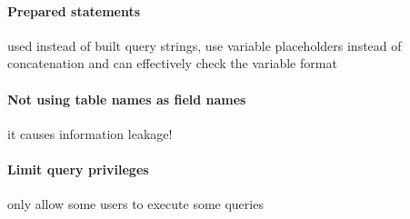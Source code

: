 \documentclass{article}
\begin{document}
\paragraph{Prepared statements} used instead of built query strings, use variable placeholders instead of concatenation and can effectively check the variable format
\paragraph{Not using table names as field names} it causes information leakage!
\paragraph{Limit query privileges} only allow some users to execute some queries
\end{document}
